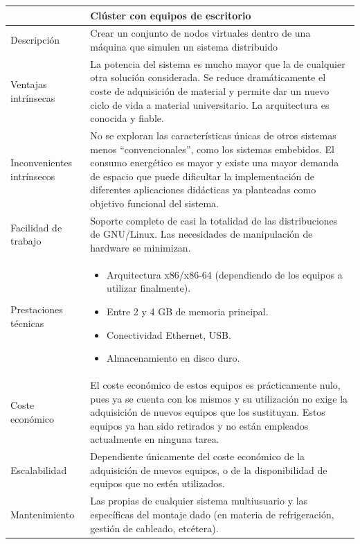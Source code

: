 \begin{table}
\begin{tabular}{|p{2.3cm}|p{12cm}|}
\hline
&\textbf{Clúster con equipos de escritorio}\\%
\hline
Descripción&Crear un conjunto de nodos virtuales dentro de una máquina que simulen un sistema distribuido\\
\hline
Ventajas intrínsecas&La potencia del sistema es mucho mayor que la de cualquier otra solución considerada. Se reduce dramáticamente el coste de adquisición de material y permite dar un nuevo ciclo de vida a material universitario. La arquitectura es conocida y fiable.\\
\hline
Inconvenientes intrínsecos&No se exploran las características únicas de otros sistemas menos ``convencionales'', como los sistemas embebidos. El consumo energético es mayor y existe una mayor demanda de espacio que puede dificultar la implementación de diferentes aplicaciones didácticas ya planteadas como objetivo funcional del sistema.
\\
\hline
Facilidad de trabajo&Soporte completo de casi la totalidad de las distribuciones de GNU/Linux. Las necesidades de manipulación de hardware se minimizan.\\
\hline
Prestaciones técnicas&\begin{itemize}[noitemsep]
  \item Arquitectura x86/x86-64 (dependiendo de los equipos a utilizar finalmente).
  \item Entre 2 y 4 GB de memoria principal.
  \item Conectividad Ethernet, USB.
  \item Almacenamiento en disco duro.
\end{itemize}\\
\hline
Coste económico&El coste económico de estos equipos es prácticamente nulo, pues ya se cuenta con los mismos y su utilización no exige la adquisición de nuevos equipos que los sustituyan. Estos equipos ya han sido retirados y no están empleados actualmente en ninguna tarea.\\
\hline
Escalabilidad&Dependiente únicamente del coste económico de la adquisición de nuevos equipos, o de la disponibilidad de equipos que no estén utilizados.\\
\hline
Mantenimiento&Las propias de cualquier sistema multiusuario y las específicas del montaje dado (en materia de refrigeración, gestión de cableado, etcétera).

\end{tabular}
\end{table}
